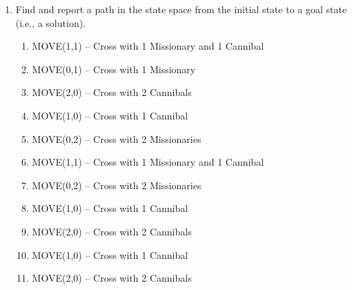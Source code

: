 \documentclass[12pt]{article}
\begin{document}
\begin{enumerate}
  \item Find and report a path in the state space from the initial state to a goal state (i.e., a solution).\par
  \begin{enumerate}
    \item MOVE(1,1) -- Cross with 1 Missionary and 1 Cannibal 
    \item MOVE(0,1) -- Cross with 1 Missionary
    \item MOVE(2,0) -- Cross with 2 Cannibals
    \item MOVE(1,0) -- Cross with 1 Cannibal
    \item MOVE(0,2) -- Cross with 2 Missionaries
    \item MOVE(1,1) -- Cross with 1 Missionary and 1 Cannibal
    \item MOVE(0,2) -- Cross with 2 Missionaries
    \item MOVE(1,0) -- Cross with 1 Cannibal
    \item MOVE(2,0) -- Cross with 2 Cannibals
    \item MOVE(1,0) -- Cross with 1 Cannibal
    \item MOVE(2,0) -- Cross with 2 Cannibals
  \end{enumerate}
\end{enumerate}
\end{document}
